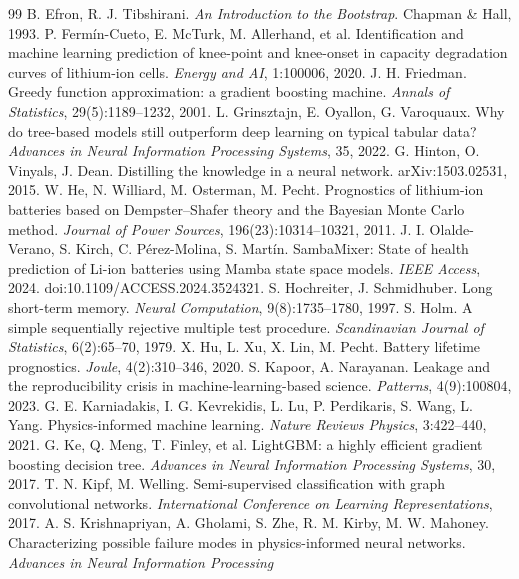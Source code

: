 \documentclass[12pt,a4paper,oneside]{report}
\theoremstyle{plain}
\theoremstyle{definition}
\begin{document}
\begin{thebibliography}{99}
 B. Efron, R. J. Tibshirani. \emph{An Introduction to the Bootstrap}. Chapman \& Hall, 1993.
 P. Fermín-Cueto, E. McTurk, M. Allerhand, et al. Identification and machine learning
  prediction of knee-point and knee-onset in capacity degradation curves of lithium-ion cells. \emph{Energy and AI},
  1:100006, 2020.
 J. H. Friedman. Greedy function approximation: a gradient boosting machine.
  \emph{Annals of Statistics}, 29(5):1189--1232, 2001.
 L. Grinsztajn, E. Oyallon, G. Varoquaux. Why do tree-based models still outperform deep
  learning on typical tabular data? \emph{Advances in Neural Information Processing Systems}, 35, 2022.
 G. Hinton, O. Vinyals, J. Dean. Distilling the knowledge in a neural network.
  arXiv:1503.02531, 2015.
 W. He, N. Williard, M. Osterman, M. Pecht. Prognostics of lithium-ion batteries based on
  Dempster--Shafer theory and the Bayesian Monte Carlo method. \emph{Journal of Power Sources}, 196(23):10314--10321,
  2011.
 J. I. Olalde-Verano, S. Kirch, C. Pérez-Molina, S. Martín. SambaMixer: State of health
  prediction of Li-ion batteries using Mamba state space models. \emph{IEEE Access}, 2024.
  doi:10.1109/ACCESS.2024.3524321.
 S. Hochreiter, J. Schmidhuber. Long short-term memory. \emph{Neural Computation},
  9(8):1735--1780, 1997.
 S. Holm. A simple sequentially rejective multiple test procedure. \emph{Scandinavian Journal of
  Statistics}, 6(2):65--70, 1979.
 X. Hu, L. Xu, X. Lin, M. Pecht. Battery lifetime prognostics. \emph{Joule}, 4(2):310--346,
  2020.
 S. Kapoor, A. Narayanan. Leakage and the reproducibility crisis in machine-learning-based
  science. \emph{Patterns}, 4(9):100804, 2023.
 G. E. Karniadakis, I. G. Kevrekidis, L. Lu, P. Perdikaris, S. Wang, L. Yang.
  Physics-informed machine learning. \emph{Nature Reviews Physics}, 3:422--440, 2021.
 G. Ke, Q. Meng, T. Finley, et al. LightGBM: a highly efficient gradient boosting decision tree.
  \emph{Advances in Neural Information Processing Systems}, 30, 2017.
 T. N. Kipf, M. Welling. Semi-supervised classification with graph convolutional networks.
  \emph{International Conference on Learning Representations}, 2017.
 A. S. Krishnapriyan, A. Gholami, S. Zhe, R. M. Kirby, M. W. Mahoney. Characterizing
  possible failure modes in physics-informed neural networks. \emph{Advances in Neural Information Processing
}
\end{thebibliography}
\end{document}
